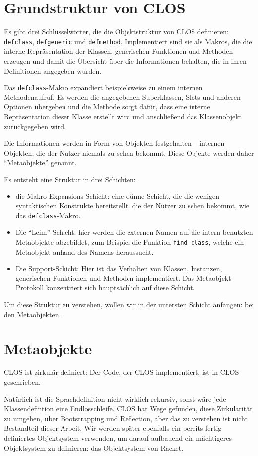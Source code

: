 

\section{Grundstruktur von CLOS}
Es gibt drei Schlüsselwörter, die die Objektstruktur von CLOS definieren:  \texttt{defclass}, \texttt{defgeneric} und \texttt{defmethod}. Implementiert sind sie als Makros, die die interne Repräsentation der Klassen, generischen Funktionen und Methoden erzeugen und damit die Übersicht über die Informationen behalten, die in ihren Definitionen angegeben wurden.

Das \texttt{defclass}-Makro expandiert beispielsweise zu einem internen Methodenaufruf. Es werden die angegebenen Superklassen, Slots und anderen Optionen übergeben und die Methode sorgt dafür, dass eine interne Repräsentation dieser Klasse erstellt wird und anschließend das Klassenobjekt zurückgegeben wird.

Die Informationen werden in Form von Objekten festgehalten -- internen Objekten, die der Nutzer niemals zu sehen bekommt. Diese Objekte werden daher ``Metaobjekte'' genannt.

Es entsteht eine Struktur in drei Schichten:
\begin{itemize}
 \item die Makro-Expansions-Schicht: eine dünne Schicht, die die wenigen syntaktischen Konstrukte bereitstellt, die der Nutzer zu sehen bekommt, wie das \texttt{defclass}-Makro.
 \item Die ``Leim''-Schicht: hier werden die externen Namen auf die intern benutzten Metaobjekte abgebildet, zum Beispiel die Funktion \texttt{find-class}, welche ein Metaobjekt anhand des Namens heraussucht.
 \item Die Support-Schicht: Hier ist das Verhalten von Klassen, Instanzen, generischen Funktionen und Methoden implementiert. Das Metaobjekt-Protokoll konzentriert sich hauptsächlich auf diese Schicht.
\end{itemize}

Um diese Struktur zu verstehen, wollen wir in der untersten Schicht anfangen: bei den Metaobjekten.

\section{Metaobjekte}
CLOS ist zirkulär definiert: Der Code, der CLOS implementiert, ist in CLOS geschrieben. 

Natürlich ist die Sprachdefinition nicht wirklich rekursiv, sonst wäre jede Klassendefintion eine Endlosschleife. CLOS hat Wege gefunden, diese Zirkularität zu umgehen, über Bootstrapping und Reflection, aber das zu verstehen ist nicht Bestandteil dieser Arbeit. Wir werden später ebenfalls ein bereits fertig definiertes Objektsystem verwenden, um darauf aufbauend ein mächtigeres Objektsystem zu definieren: das Objektsystem von Racket.

